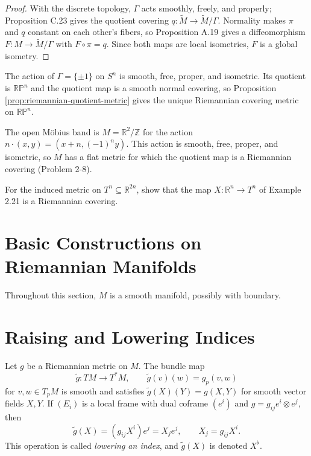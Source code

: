 \begin{proof}
\sketch With the discrete topology, $\Gamma$ acts smoothly, freely, and properly; Proposition C.23 gives the quotient covering $q:\widetilde M\to\widetilde M/\Gamma$. Normality makes $\pi$ and $q$ constant on each other's fibers, so Proposition A.19 gives a diffeomorphism $F:M\to\widetilde M/\Gamma$ with $F\circ\pi=q$. Since both maps are local isometries, $F$ is a global isometry.
\end{proof}

\begin{example}
\label{ex:real-projective-space-metric}
The action of $\Gamma=\{\pm1\}$ on $S^n$ is smooth, free, proper, and isometric. Its quotient is $\mathbb{RP}^n$ and the quotient map is a smooth normal covering, so Proposition \ref{prop:riemannian-quotient-metric} gives the unique Riemannian covering metric on $\mathbb{RP}^n$.
\end{example}

\begin{example}
\label{ex:open-mobius-band}
The open Möbius band is $M=\mathbb R^2/\mathbb Z$ for the action $n\cdot(x,y)=(x+n,(-1)^ny)$. This action is smooth, free, proper, and isometric, so $M$ has a flat metric for which the quotient map is a Riemannian covering (Problem 2-8).
\end{example}

\begin{exercise}
\label{exer:torus-covering}
For the induced metric on $T^n\subseteq\mathbb R^{2n}$, show that the map $X:\mathbb R^n\to T^n$ of Example 2.21 is a Riemannian covering.
\end{exercise}
\section{Basic Constructions on Riemannian Manifolds}

Throughout this section, $M$ is a smooth manifold, possibly with boundary.

\section{Raising and Lowering Indices}

Let $g$ be a Riemannian metric on $M$. The bundle map
\[
\widetilde g\colon TM\longrightarrow T^*M,
\qquad \widetilde g(v)(w)=g_p(v,w)
\]
for $v,w\in T_pM$ is smooth and satisfies $\widetilde g(X)(Y)=g(X,Y)$ for smooth
vector fields $X,Y$. If $(E_i)$ is a local frame with dual coframe $(e^i)$ and
$g=g_{ij}e^i\otimes e^j$, then
\[
\widetilde g(X)=(g_{ij}X^i)e^j=X_je^j,
\qquad X_j=g_{ij}X^i.
\]
This operation is called \emph{lowering an index}, and $\widetilde g(X)$ is denoted
$X^\flat$.

